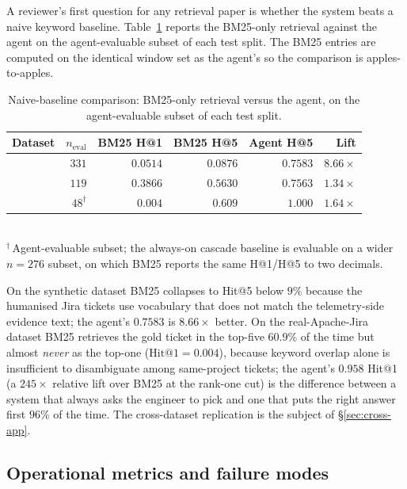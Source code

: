 A reviewer's first question for any retrieval paper is whether the system beats a naive keyword baseline. Table~\ref{tab:bm25} reports the BM25-only retrieval against the agent on the agent-evaluable subset of each test split. The BM25 entries are computed on the identical window set as the agent's so the comparison is apples-to-apples.

\begin{table}[ht]
  \centering
  \caption{Naive-baseline comparison: BM25-only retrieval versus the agent, on the agent-evaluable subset of each test split.}
  \label{tab:bm25}
  \footnotesize
  \setlength{\tabcolsep}{3pt}
  \begin{tabular}{@{}l r rr r r@{}}
    \toprule
    Dataset & $n_{\text{eval}}$ & BM25 H@1 & BM25 H@5 & Agent H@5 & Lift \\
    \midrule
    \dsob{}    & $331$ & $0.0514$ & $0.0876$ & $0.7583$ & $\mathbf{8.66\times}$ \\
    \dsotel{}  & $119$ & $0.3866$ & $0.5630$ & $0.7563$ & $1.34\times$ \\
    \dswol{}   & $48^\dagger$ & $0.004$ & $0.609$ & $1.000$ & $1.64\times$ \\
    \bottomrule
  \end{tabular}
  \\[2pt]
  {\scriptsize $^\dagger$\,Agent-evaluable subset; the always-on cascade baseline is evaluable on a wider $n=276$ subset, on which BM25 reports the same H@1/H@5 to two decimals.}
\end{table}

On the synthetic dataset BM25 collapses to Hit@5 below $9\%$ because the humanised Jira tickets use vocabulary that does not match the telemetry-side evidence text; the agent's $0.7583$ is $8.66\times$ better. On the real-Apache-Jira dataset BM25 retrieves the gold ticket in the top-five $60.9\%$ of the time but almost \emph{never} as the top-one ($\text{Hit@1} = 0.004$), because keyword overlap alone is insufficient to disambiguate among same-project tickets; the agent's $0.958$ Hit@1 (a $245\times$ relative lift over BM25 at the rank-one cut) is the difference between a system that always asks the engineer to pick and one that puts the right answer first $96\%$ of the time. The cross-dataset replication is the subject of \S\ref{sec:cross-app}.

\subsection{Operational metrics and failure modes}
\label{sec:results:failures}

